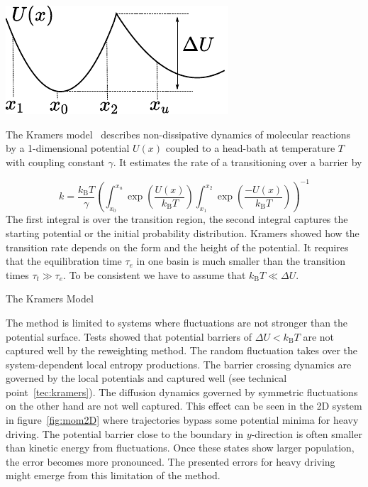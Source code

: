 \begin{Technical Point}[tp]

\begin{minipage}{0.03\textwidth}
\hfill\vspace{0.1cm}
\end{minipage}%
\begin{minipage}{0.35\textwidth}
\includegraphics{../images/kramers.pdf}
\end{minipage}
\hfill
\begin{minipage}{0.6\textwidth}
The Kramers model~\cite{kramers1940brownian} describes non-dissipative dynamics of molecular reactions by a 1-dimensional potential $U(x)$ coupled to a head-bath at temperature $T$ with coupling constant $\gamma$. It estimates the rate of a transitioning over a barrier by 
\end{minipage}
\begin{equation*} 
 k = \frac{k_{\mathrm{B} }T}{\gamma} \left ( \int_{x_0}^{x_u} \exp \left ( \frac{U(x)}{k_{\mathrm{B} }T} \right ) \int_{x_1}^{x_2} \exp \left ( \frac{-U(x)}{k_{\mathrm{B} }T} \right )\right )^{-1}
\end{equation*}
The first integral is over the transition region, the second integral captures the starting potential or the initial probability distribution. Kramers showed 
how the transition rate depends on the form and the height of the potential. It requires that the equilibration time $\tau_e$ in one basin is much smaller than the transition times $\tau_t \gg \tau_e$. To be consistent we have to assume that $k_{\mathrm{B} }T \ll \Delta U$.
% 

\caption{The Kramers Model}\label{tec:kramers}
\end{Technical Point} 


The method is limited to systems where fluctuations are not stronger than the potential surface. Tests showed that potential barriers of $ \Delta U < k_{\mathrm{B} }T$ are not captured well by the reweighting method. The random fluctuation takes over the system-dependent local entropy productions.  The barrier crossing dynamics are governed by the local potentials and captured well (see technical point~\ref{tec:kramers}). The diffusion dynamics governed by symmetric fluctuations on the other hand are not well captured. This effect can be seen in the 2D system in figure~\ref{fig:mom2D} where trajectories bypass some potential minima for heavy driving. The potential barrier close to the boundary in $y$-direction is often smaller than kinetic energy from fluctuations. Once these states show larger population, the error becomes more pronounced. The presented errors for heavy driving might emerge from this limitation of the method. 

